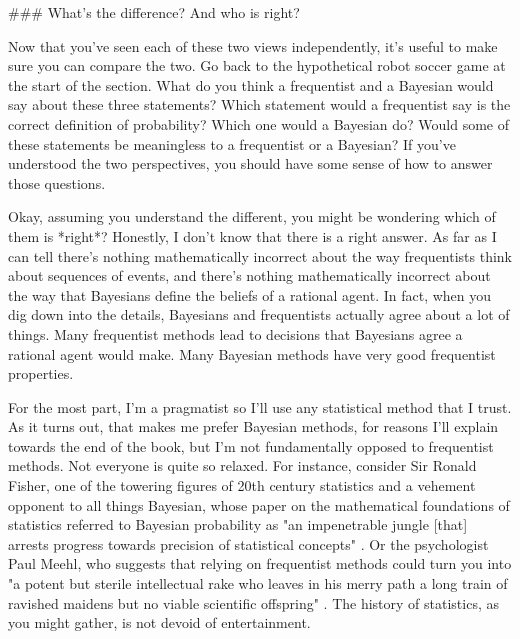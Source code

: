 ### What's the difference? And who is right?

Now that you've seen each of these two views independently, it's useful to make sure you can compare the two. Go back to the hypothetical robot soccer game at the start of the section. What do you think a frequentist and a Bayesian would say about these three statements? Which statement would a frequentist say is the correct definition of probability? Which one would a Bayesian do? Would some of these statements be meaningless to a frequentist or a Bayesian? If you've understood the two perspectives, you should have some sense of how to answer those questions.

Okay, assuming you understand the different, you might be wondering which of them is *right*? Honestly, I don't know that there is a right answer. As far as I can tell there's nothing mathematically incorrect about the way frequentists think about sequences of events, and there's nothing mathematically incorrect about the way that Bayesians define the beliefs of a rational agent. In fact, when you dig down into the details, Bayesians and frequentists actually agree about a lot of things. Many frequentist methods lead to decisions that Bayesians agree a rational agent would make. Many Bayesian methods have very good frequentist properties. 

For the most part, I'm a pragmatist so I'll use any statistical method that I trust. As it turns out, that makes me prefer Bayesian methods, for reasons I'll explain towards the end of the book, but I'm not fundamentally opposed to frequentist methods. Not everyone is quite so relaxed. For instance, consider Sir Ronald Fisher, one of the towering figures of 20th century statistics and a vehement opponent to all things Bayesian, whose paper on the mathematical foundations of statistics referred to Bayesian probability as "an impenetrable jungle [that] arrests progress towards precision of statistical concepts" \cite[p. 311]{Fisher1922b}. Or the psychologist Paul Meehl, who suggests that relying on frequentist methods could turn you into "a potent but sterile intellectual rake who leaves in his merry path a long train of ravished maidens but no viable scientific offspring" \cite[p. 114]{Meehl1967}. The history of statistics, as you might gather, is not devoid of entertainment.

